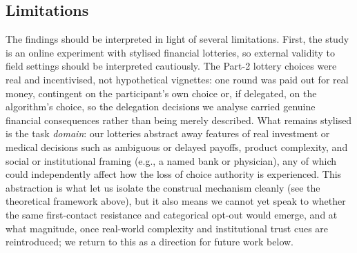 \documentclass[a4paper, 12pt, fleqn]{article}
\theoremstyle{hypstyle}
\begin{document}
\subsection{Limitations}\label{sec:limitations}
The findings should be interpreted in light of several limitations. First, the study is an online experiment with stylised financial lotteries, so external validity to field settings should be interpreted cautiously. The Part-2 lottery choices were real and incentivised, not hypothetical vignettes: one round was paid out for real money, contingent on the participant's own choice or, if delegated, on the algorithm's choice, so the delegation decisions we analyse carried genuine financial consequences rather than being merely described. What remains stylised is the task \emph{domain}: our lotteries abstract away features of real investment or medical decisions such as ambiguous or delayed payoffs, product complexity, and social or institutional framing (e.g., a named bank or physician), any of which could independently affect how the loss of choice authority is experienced. This abstraction is what let us isolate the construal mechanism cleanly (see the theoretical framework above), but it also means we cannot yet speak to whether the same first-contact resistance and categorical opt-out would emerge, and at what magnitude, once real-world complexity and institutional trust cues are reintroduced; we return to this as a direction for future work below. 
\end{document}
